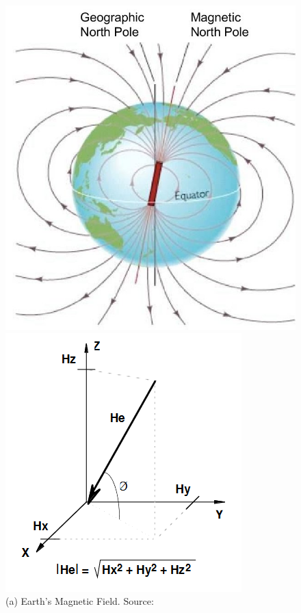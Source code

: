 \begin{figure}[H]
	\begin{minipage}{0.48\linewidth}
		\centering
		\includegraphics[width=\textwidth]{Figures/magneticfield.jpg}
		\caption*{(a) Earth's Magnetic Field. Source: \cite{filipski2006nanosatellite}}
	\end{minipage}\hfill
	\begin{minipage}{0.48\linewidth}
		\centering
		\includegraphics[width=\textwidth]{Figures/fieldaxis.png}

\end{minipage}
\end{figure}
